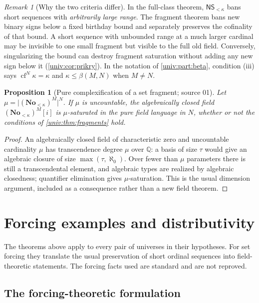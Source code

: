 \documentclass[11pt,letterpaper]{article}
\numberwithin{equation}{section}
\newtheorem{proposition}[proposition]{Proposition}
\theoremstyle{definition}
\theoremstyle{remark}
\newtheorem{remark}[remark]{Remark}
\newcommand{\No}{\mathbf{No}}
\newcommand{\Q}{\mathbb Q}
\newcommand{\cf}{\operatorname{cf}}
\newcommand{\NS}{\mathsf{NS}}
\newcommand{\abs}[1]{\lvert#1\rvert}
\begin{document}
\begin{remark}[Why the two criteria differ]
In the full-class theorem, $\NS_{<\kappa}$ bans short sequences with
\emph{arbitrarily large range}. The fragment theorem bans new binary signs
below a fixed birthday bound and separately preserves the cofinality of that
bound. A short sequence with unbounded range at a much larger cardinal may be
invisible to one small fragment but visible to the full old field. Conversely,
singularizing the bound can destroy fragment saturation without adding any new
sign below it (\cref{univ:cor:prikry}). In the notation of
\cref{univ:part:beta}, condition (iii) says $\cf^N\kappa=\kappa$ and
$\kappa\le\beta(M,N)$ when $M\ne N$.
\end{remark}

\begin{proposition}[Pure complexification of a set fragment; source 01]\label{univ:prop:setACF}
Let $\mu=\abs{(\No_{<\kappa})^M}^N$. If $\mu$ is uncountable, the algebraically
closed field $(\No_{<\kappa})^M[i]$ is $\mu$-saturated in the pure field
language in $N$, whether or not the conditions of \cref{univ:thm:fragments}
hold.
\end{proposition}
\begin{proof}
An algebraically closed field of characteristic zero and uncountable
cardinality $\mu$ has transcendence degree $\mu$ over $\Q$: a basis of size
$\tau$ would give an algebraic closure of size $\max(\tau,\aleph_0)$. Over fewer
than $\mu$ parameters there is still a transcendental element, and algebraic
types are realized by algebraic closedness; quantifier elimination gives
$\mu$-saturation. This is the usual dimension argument, included as a
consequence rather than a new field theorem.
\end{proof}

\section{Forcing examples and distributivity}\label{univ:sec:examples}

The theorems above apply to every pair of universes in their hypotheses. For
set forcing they translate the usual preservation of short ordinal sequences
into field-theoretic statements. The forcing facts used are standard
\cite{Jech,Prikry,Gitik,Benhamou} and are not reproved.

\subsection{The forcing-theoretic formulation}
\end{document}
